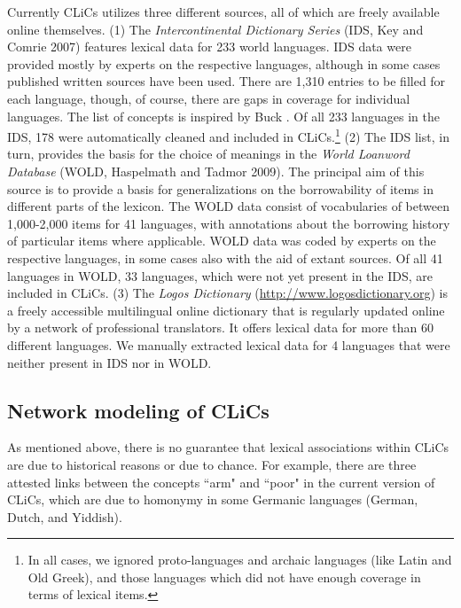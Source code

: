 Currently CLiCs utilizes three different sources, all of which are freely available online
themselves.  (1) The \emph{Intercontinental Dictionary Series} (IDS, Key and Comrie 2007) 
\nocite{Key2007} features lexical
data for 233 world languages. IDS data were provided mostly by experts on the respective languages,
although in some cases published written sources have been used. There are 1,310 entries to be
filled for each language, though, of course, there are gaps in coverage for individual languages.
The list of concepts is inspired by Buck . Of all 233 languages in the IDS, 178 were
automatically cleaned and included in CLiCs.\footnote{In all cases, we ignored proto-languages and
archaic languages (like Latin and Old Greek), and those languages which
did not have enough coverage in terms of lexical items.} (2) The IDS list, in turn, provides the basis for the
choice of meanings in the \emph{World Loanword Database} (WOLD, Haspelmath and Tadmor 2009).
\nocite{Wold2009} The principal aim
of this source is to provide a basis for generalizations on the borrowability of items in different
parts of the lexicon. The WOLD data consist of vocabularies of between 1,000-2,000 items for 41
languages, with annotations about the borrowing history of particular items where applicable. WOLD
data was coded by experts on the respective languages, in some cases also with the aid of extant
sources. Of all 41 languages in WOLD, 33 languages, which were not yet present in the IDS, 
are included in CLiCs.  (3) The \emph{Logos Dictionary}
(\url{http://www.logosdictionary.org}) is a freely accessible multilingual online dictionary that is
regularly updated online by a network of professional translators. It offers lexical data for more
than 60 different languages. We manually extracted lexical data for 4 languages that were neither
present in IDS nor in WOLD. 


\subsection{Network modeling of CLiCs}
As mentioned above, there is no guarantee that lexical associations within CLiCs are due to
historical reasons or due to chance. For example, there are three attested links between the
concepts ``arm" and ``poor" in the current version of CLiCs, which are due to homonymy in some
Germanic languages (German, Dutch, and Yiddish).
 
